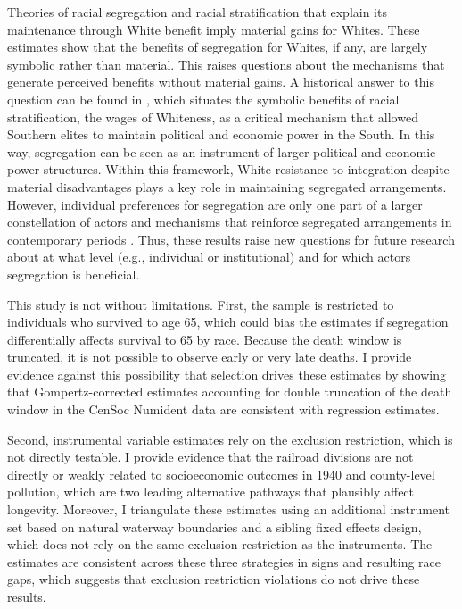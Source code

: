 \documentclass[11pt]{article}
\begin{document}
Theories of racial segregation and racial stratification that explain its maintenance through White benefit imply material gains for Whites. These estimates show that the benefits of segregation for Whites, if any, are largely symbolic rather than material. This raises questions about the mechanisms that generate perceived benefits without material gains. A historical answer to this question can be found in \citet{dubois_black_1935}, which situates the symbolic benefits of racial stratification, the wages of Whiteness, as a critical mechanism that allowed Southern elites to maintain political and economic power in the South. In this way, segregation can be seen as an instrument of larger political and economic power structures. Within this framework, White resistance to integration despite material disadvantages plays a key role in maintaining segregated arrangements. However, individual preferences for segregation are only one part of a larger constellation of actors and mechanisms that reinforce segregated arrangements in contemporary periods \citep{krysan_cycle_2017}. Thus, these results raise new questions for future research about at what level (e.g., individual or institutional) and for which actors segregation is beneficial.

This study is not without limitations. First, the sample is restricted to individuals who survived to age 65, which could bias the estimates if segregation differentially affects survival to 65 by race. Because the death window is truncated, it is not possible to observe early or very late deaths. I provide evidence against this possibility that selection drives these estimates by showing that Gompertz-corrected estimates accounting for double truncation of the death window in the CenSoc Numident data are consistent with regression estimates. 

Second, instrumental variable estimates rely on the exclusion restriction, which is not directly testable. I provide evidence that the railroad divisions are not directly or weakly related to socioeconomic outcomes in 1940 and county-level pollution, which are two leading alternative pathways that plausibly affect longevity. Moreover, I triangulate these estimates using an additional instrument set based on natural waterway boundaries and a sibling fixed effects design, which does not rely on the same exclusion restriction as the instruments. The estimates are consistent across these three strategies in signs and resulting race gaps, which suggests that exclusion restriction violations do not drive these results.
\end{document}

